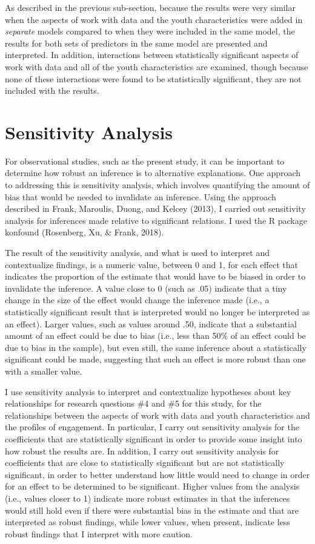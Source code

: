 \documentclass[]{msu-thesis}
\theoremstyle{definition}
\theoremstyle{definition}
\theoremstyle{definition}
\theoremstyle{remark}
\begin{document}
As described in the previous sub-section, because the results were very
similar when the aspects of work with data and the youth characteristics
were added in \emph{separate} models compared to when they were included
in the same model, the results for both sets of predictors in the same
model are presented and interpreted. In addition, interactions between
statistically significant aspects of work with data and all of the youth
characteristics are examined, though because none of these interactions
were found to be statistically significant, they are not included with
the results.

\section{Sensitivity Analysis}\label{sensitivity-analysis}

For observational studies, such as the present study, it can be
important to determine how robust an inference is to alternative
explanations. One approach to addressing this is sensitivity analysis,
which involves quantifying the amount of bias that would be needed to
invalidate an inference. Using the approach described in Frank,
Maroulis, Duong, and Kelcey (2013), I carried out sensitivity analysis
for inferences made relative to significant relations. I used the R
package konfound (Rosenberg, Xu, \& Frank, 2018).

The result of the sensitivity analysis, and what is used to interpret
and contextualize findings, is a numeric value, between 0 and 1, for
each effect that indicates the proportion of the estimate that would
have to be biased in order to invalidate the inference. A value close to
0 (such as .05) indicate that a tiny change in the size of the effect
would change the inference made (i.e., a statistically significant
result that is interpreted would no longer be interpreted as an effect).
Larger values, such as values around .50, indicate that a substantial
amount of an effect could be due to bias (i.e., less than 50\% of an
effect could be due to bias in the sample), but even still, the same
inference about a statistically significant could be made, suggesting
that such an effect is more robust than one with a smaller value.

I use sensitivity analysis to interpret and contextualize hypotheses
about key relationships for research questions \#4 and \#5 for this
study, for the relationships between the aspects of work with data and
youth characteristics and the profiles of engagement. In particular, I
carry out sensitivity analysis for the coefficients that are
statistically significant in order to provide some insight into how
robust the results are. In addition, I carry out sensitivity analysis
for coefficients that are close to statistically significant but are not
statistically significant, in order to better understand how little
would need to change in order for an effect to be determined to be
significant. Higher values from the analysis (i.e., values closer to 1)
indicate more robust estimates in that the inferences would still hold
even if there were substantial bias in the estimate and that are
interpreted as robust findings, while lower values, when present,
indicate less robust findings that I interpret with more caution.
\end{document}
